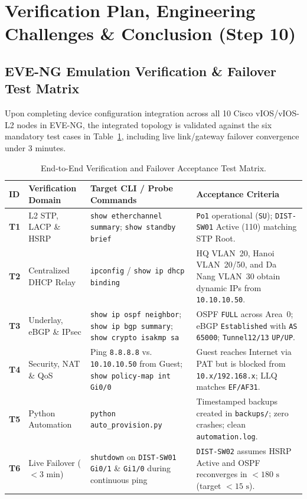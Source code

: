 \section{Verification Plan, Engineering Challenges \& Conclusion (Step 10)}

\subsection{EVE-NG Emulation Verification \& Failover Test Matrix}
Upon completing device configuration integration across all 10 Cisco vIOS/vIOS-L2 nodes in EVE-NG, the integrated topology is validated against the six mandatory test cases in Table~\ref{tab:verification_matrix}, including live link/gateway failover convergence under 3 minutes.

\begin{table}[H]
\centering
\caption{End-to-End Verification and Failover Acceptance Test Matrix.}
\label{tab:verification_matrix}
\scriptsize
\begin{tabularx}{\textwidth}{|p{0.8cm}|p{3.4cm}|p{4.3cm}|X|}
\hline
\textbf{ID} & \textbf{Verification Domain} & \textbf{Target CLI / Probe Commands} & \textbf{Acceptance Criteria} \\
\hline
\textbf{T1} & L2 STP, LACP \& HSRP & \texttt{show etherchannel summary}; \texttt{show standby brief} & \texttt{Po1} operational (\texttt{SU}); \texttt{DIST-SW01} Active (110) matching STP Root. \\
\hline
\textbf{T2} & Centralized DHCP Relay & \texttt{ipconfig} / \texttt{show ip dhcp binding} & HQ VLAN~20, Hanoi VLAN~20/50, and Da Nang VLAN~30 obtain dynamic IPs from \texttt{10.10.10.50}. \\
\hline
\textbf{T3} & Underlay, eBGP \& IPsec & \texttt{show ip ospf neighbor}; \texttt{show ip bgp summary}; \texttt{show crypto isakmp sa} & OSPF \texttt{FULL} across Area~0; eBGP \texttt{Established} with \texttt{AS 65000}; \texttt{Tunnel12/13} \texttt{UP/UP}. \\
\hline
\textbf{T4} & Security, NAT \& QoS & Ping \texttt{8.8.8.8} vs. \texttt{10.10.10.50} from Guest; \texttt{show policy-map int Gi0/0} & Guest reaches Internet via PAT but is blocked from \texttt{10.x/192.168.x}; LLQ matches \texttt{EF/AF31}. \\
\hline
\textbf{T5} & Python Automation & \texttt{python auto\_provision.py} & Timestamped backups created in \texttt{backups/}; zero crashes; clean \texttt{automation.log}. \\
\hline
\textbf{T6} & Live Failover ($<3$ min) & \texttt{shutdown} on \texttt{DIST-SW01 Gi0/1} \& \texttt{Gi1/0} during continuous ping & \texttt{DIST-SW02} assumes HSRP Active and OSPF reconverges in $< 180\text{ s}$ (target $< 15\text{ s}$). \\
\hline
\end{tabularx}
\end{table}

